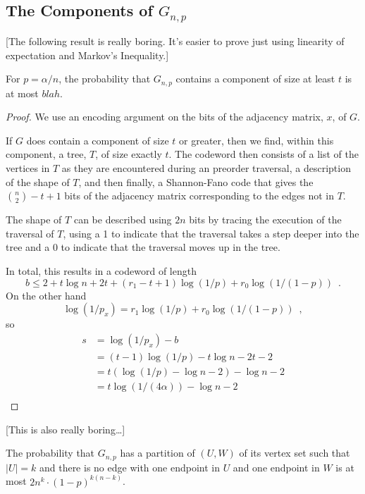 \documentclass{patmorin}
\begin{document}
\subsection{The Components of $G_{n,p}$}

[The following result is really boring. It's easier to prove just using linearity of expectation and Markov's Inequality.]

\begin{thm}
  For $p=\alpha/n$, the probability that $G_{n,p}$ contains a component of size at least $t$ is at most $blah$.
\end{thm}

\begin{proof}
  We use an encoding argument on the bits of the adjacency matrix, $x$,
  of $G$.

  If $G$ does contain a component of size $t$ or greater, then we
  find, within this component, a tree, $T$, of size exactly $t$.  The
  codeword then consists of a list of the vertices in $T$ as they are
  encountered during an preorder traversal, a description of the shape
  of $T$, and then finally, a Shannon-Fano code that gives the
  $\binom{n}{2}-t+1$ bits of the adjacency matrix corresponding to the
  edges not in $T$.

  The shape of $T$ can be described using $2n$ bits by tracing the
  execution of the traversal of $T$, using a 1 to indicate that the
  traversal takes a step deeper into the tree and a 0 to indicate that
  the traversal moves up in the tree.

  In total, this results in a codeword of length
  \[   
    b \le 2 + t\log n + 2t + (r_1-t+1)\log(1/p) + r_0\log(1/(1-p))  \enspace . 
  \]
  On the other hand
  \[   
     \log (1/p_x) = r_1\log(1/p) + r_0\log(1/(1-p)) \enspace ,
  \]
  so
  \begin{align*}
     s & = \log(1/p_x) - b \\
       & =  (t-1)\log(1/p) - t\log n - 2t - 2 \\
       & = t(\log(1/p)-\log n - 2) - \log n - 2 \\
       & = t\log(1/(4\alpha)) - \log n - 2 \\
  \end{align*}
\end{proof}

[This is also really boring\ldots]

\begin{lem}
  The probability that $G_{n,p}$ has a partition of $(U,W)$ of its vertex
  set such that $|U|=k$ and there is no edge with one endpoint in $U$
  and one endpoint in $W$ is at most $2n^k\cdot (1-p)^{k(n-k)}$.
\end{lem}
\end{document}
